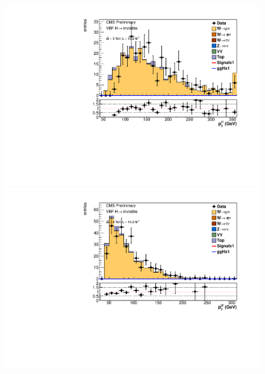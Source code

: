 \begin{figure}
  \includegraphics[width=.6\largefigwidth]{plots/parked/AN-14-243-figs/output_sigreg/munu_jet1_pt.pdf}
  \includegraphics[width=.6\largefigwidth]{plots/parked/AN-14-243-figs/output_sigreg/munu_jet2_pt.pdf}


\end{figure}
